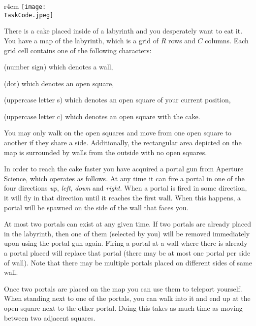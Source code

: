 \documentclass{boi2014}
\renewcommand{\TaskCode}{portals}
\newcommand{\constant}[1]{{\tt #1}}
\begin{document}
    \begin{wrapfigure}[4]{r}{4cm}
        \vspace{-24pt}
		\texttt{[image: \\TaskCode.jpeg]}
	\end{wrapfigure}

    There is a cake placed inside of a labyrinth and you desperately want to eat
    it. You have a map of the labyrinth, which is a grid of $R$ rows and $C$
    columns.  Each grid cell contains one of the following characters:
    \begin{description}[itemindent=1pt]
    	\item[\constant{\#}] (number sign) which denotes a wall,
        \item[\constant{.}] (dot) which denotes an open square,
        \item[\constant{S}] (uppercase letter s) which denotes an open square of
        your current position,
        \item[\constant{C}] (uppercase letter c) which denotes an open square
        with the cake.
    \end{description}

    You may only walk on the open squares and move from one open square to
    another if they share a side. Additionally, the rectangular area depicted on
    the map is surrounded by walls from the outside with no open squares.

    In order to reach the cake faster you have acquired a portal gun from
    Aperture Science\texttrademark{}, which operates as follows.
    At any time it can fire a portal in one of the four directions
    \emph{up}, \emph{left}, \emph{down} and \emph{right}.
    When a portal is fired in some direction, it will fly in that direction
    until it reaches the first wall. When this happens, a portal
    will be spawned on the side of the wall that faces you.

    At most two portals can exist at any given time. If two portals are already
    placed in the labyrinth, then one of them (selected by you) will be removed
    immediately upon using the portal gun again. Firing a portal at a wall where
    there is already a portal placed will replace that portal (there may be at
    most one portal per side of wall).  Note that there may be multiple portals
    placed on different sides of same wall.

    Once two portals are placed on the map you can use them to
    teleport yourself. When standing next to one of the portals,
    you can walk into it and end up at the open square next to the other
    portal. Doing this takes as much time as moving between two
    adjacent squares.
\end{document}
